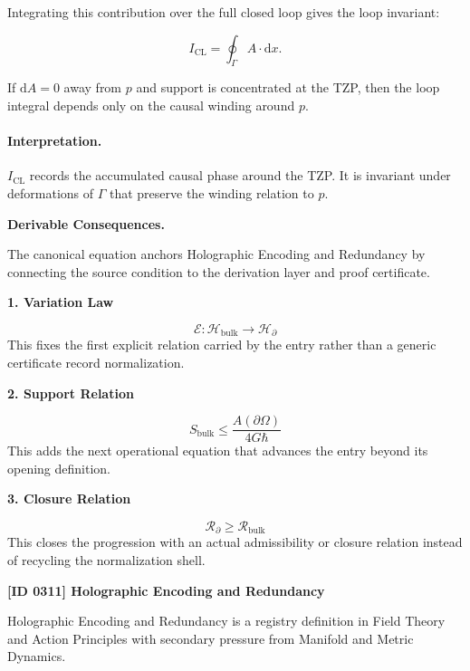Integrating this contribution over the full closed loop gives the loop invariant:

\begin{equation}
I_{\mathrm{CL}}
=
\oint_{\Gamma} A\cdot \mathrm{d}x .
\end{equation}

If $\mathrm{d}A=0$ away from $p$ and support is concentrated at the TZP, then the loop integral depends only on the causal winding around $p$.

\paragraph{Interpretation.}
$I_{\mathrm{CL}}$ records the accumulated causal phase around the TZP. It is invariant under deformations of $\Gamma$ that preserve the winding relation to $p$.

\par\vspace{0.35em}
\noindent\textbf{Derivable Consequences.}\quad
\begingroup
\footnotesize
\raggedright
The canonical equation anchors Holographic Encoding and Redundancy by connecting the source condition to the derivation layer and proof certificate.
\par\endgroup

\noindent\textbf{1. Variation Law}\par
\[
\mathcal{E}:\mathcal{H}_{\mathrm{bulk}}\longrightarrow \mathcal{H}_{\partial}
\]
\noindent This fixes the first explicit relation carried by the entry rather than a generic certificate record normalization.\par
\noindent\textbf{2. Support Relation}\par
\[
S_{\mathrm{bulk}}\leq \frac{A(\partial\Omega)}{4G\hbar}
\]
\noindent This adds the next operational equation that advances the entry beyond its opening definition.\par
\noindent\textbf{3. Closure Relation}\par
\[
\mathcal{R}_{\partial}\geq \mathcal{R}_{\mathrm{bulk}}
\]
\noindent This closes the progression with an actual admissibility or closure relation instead of recycling the normalization shell.\par

\clearpage
\noindent\textbf{[ID 0311] Holographic Encoding and Redundancy}\par
\vspace{0.35em}
\begingroup\small
{}
Holographic Encoding and Redundancy is a registry definition in Field Theory and Action Principles with secondary pressure from Manifold and Metric Dynamics.


